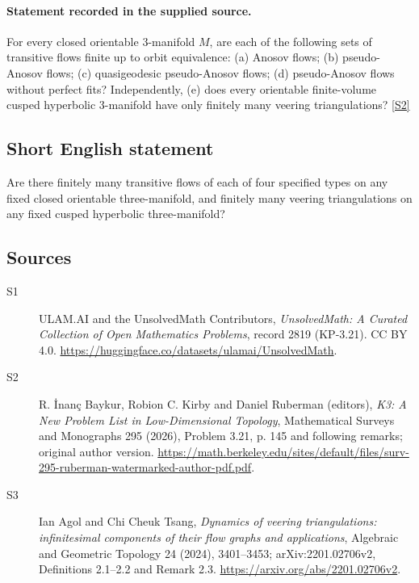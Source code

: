 \documentclass[11pt]{article}
\newcommand{\sref}[2]{\hyperlink{source:#1:#2}{[S#2]}}
\begin{document}
\paragraph{Statement recorded in the supplied source.}
For every closed orientable $3$-manifold $M$, are each of the following sets of transitive flows finite up to orbit equivalence: (a) Anosov flows; (b) pseudo-Anosov flows; (c) quasigeodesic pseudo-Anosov flows; (d) pseudo-Anosov flows without perfect fits? Independently, (e) does every orientable finite-volume cusped hyperbolic $3$-manifold have only finitely many veering triangulations? \sref{2819}{2}
\subsection{Short English statement}
Are there finitely many transitive flows of each of four specified types on any fixed closed orientable three-manifold, and finitely many veering triangulations on any fixed cusped hyperbolic three-manifold?
\subsection{Sources}
\begin{description}
\item[\hypertarget{source:2819:1}{S1}] ULAM.AI and the UnsolvedMath Contributors, \emph{UnsolvedMath: A Curated Collection of Open Mathematics Problems}, record 2819 (KP-3.21). CC BY 4.0. \url{https://huggingface.co/datasets/ulamai/UnsolvedMath}.
\item[\hypertarget{source:2819:2}{S2}] R. İnanç Baykur, Robion C. Kirby and Daniel Ruberman (editors), \emph{K3: A New Problem List in Low-Dimensional Topology}, Mathematical Surveys and Monographs 295 (2026), Problem 3.21, p. 145 and following remarks; original author version. \url{https://math.berkeley.edu/sites/default/files/surv-295-ruberman-watermarked-author-pdf.pdf}.
\item[\hypertarget{source:2819:3}{S3}] Ian Agol and Chi Cheuk Tsang, \emph{Dynamics of veering triangulations: infinitesimal components of their flow graphs and applications}, Algebraic and Geometric Topology 24 (2024), 3401--3453; arXiv:2201.02706v2, Definitions 2.1--2.2 and Remark 2.3. \url{https://arxiv.org/abs/2201.02706v2}.
\end{description}
\label{end:2819}
\end{document}

